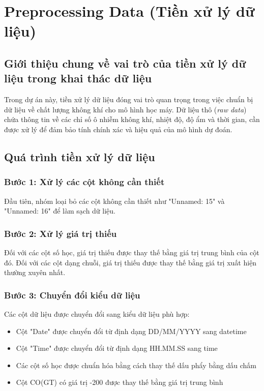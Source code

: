 \section{Preprocessing Data (Tiền xử lý dữ liệu)}

\subsection{Giới thiệu chung về vai trò của tiền xử lý dữ liệu trong khai thác dữ liệu}

\hspace{0.5cm}Trong dự án này, tiền xử lý dữ liệu đóng vai trò quan trọng trong việc chuẩn bị dữ liệu về chất lượng không khí cho mô hình học máy. Dữ liệu thô (\textit{raw data}) chứa thông tin về các chỉ số ô nhiễm không khí, nhiệt độ, độ ẩm và thời gian, cần được xử lý để đảm bảo tính chính xác và hiệu quả của mô hình dự đoán.

\subsection{Quá trình tiền xử lý dữ liệu}

\subsubsection{Bước 1: Xử lý các cột không cần thiết}
\hspace{0.5cm}Đầu tiên, nhóm loại bỏ các cột không cần thiết như "Unnamed: 15" và "Unnamed: 16" để làm sạch dữ liệu.

\subsubsection{Bước 2: Xử lý giá trị thiếu}
\hspace{0.5cm}Đối với các cột số học, giá trị thiếu được thay thế bằng giá trị trung bình của cột đó. Đối với các cột dạng chuỗi, giá trị thiếu được thay thế bằng giá trị xuất hiện thường xuyên nhất.

\subsubsection{Bước 3: Chuyển đổi kiểu dữ liệu}
\hspace{0.5cm}Các cột dữ liệu được chuyển đổi sang kiểu dữ liệu phù hợp:
\begin{itemize}
    \item Cột "Date" được chuyển đổi từ định dạng DD/MM/YYYY sang datetime
    \item Cột "Time" được chuyển đổi từ định dạng HH.MM.SS sang time
    \item Các cột số học được chuẩn hóa bằng cách thay thế dấu phẩy bằng dấu chấm
    \item Cột CO(GT) có giá trị -200 được thay thế bằng giá trị trung bình
\end{itemize}

